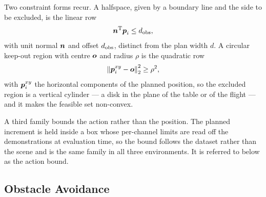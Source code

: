 Two constraint forms recur. A halfspace, given by a boundary line and the side to be excluded, is the
linear row
\begin{equation}\label{eq:method:env:halfspace}
  \boldsymbol{n}^{\textrm{T}}\boldsymbol{p}_{i} \le d_{\textrm{obs}} ,
\end{equation}
with unit normal $\boldsymbol{n}$ and offset $d_{\textrm{obs}}$, distinct from the plan width $d$. A circular keep-out region with centre $\boldsymbol{o}$ and radius
$\rho$ is the quadratic row
\begin{equation}\label{eq:method:env:disk}
  \left\|\boldsymbol{p}_{i}^{xy}-\boldsymbol{o}\right\|_{2}^{2} \ge \rho^{2},
\end{equation}
with $\boldsymbol{p}_{i}^{xy}$ the horizontal components of the planned position, so the excluded region is a vertical
cylinder --- a disk in the plane of the table or of the flight --- and it makes the feasible set non-convex.

A third family bounds the action rather than the position. The planned increment is held inside a
box whose per-channel limits are read off the demonstrations at evaluation time, so the bound
follows the dataset rather than the scene and is the same family in all three environments. It is
referred to below as the action bound.

\subsection{Obstacle Avoidance}\label{sec:method:env:avoiding}

